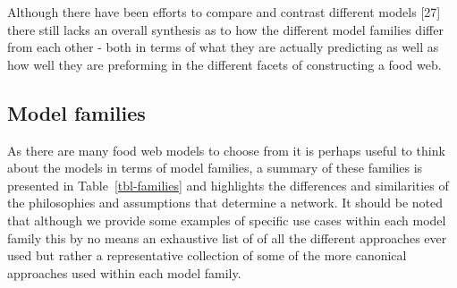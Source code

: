 \documentclass[
]{article}
\begin{document}
Although there have been efforts to compare and contrast different
models {[}27{]} there still lacks an overall synthesis as to how the
different model families differ from each other - both in terms of what
they are actually predicting as well as how well they are preforming in
the different facets of constructing a food web.

\subsection{Model families}\label{model-families}

As there are many food web models to choose from it is perhaps useful to
think about the models in terms of model families, a summary of these
families is presented in Table~\ref{tbl-families} and highlights the
differences and similarities of the philosophies and assumptions that
determine a network. It should be noted that although we provide some
examples of specific use cases within each model family this by no means
an exhaustive list of of all the different approaches ever used but
rather a representative collection of some of the more canonical
approaches used within each model family.
\end{document}

